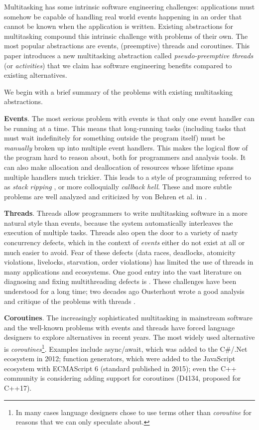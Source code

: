 \documentclass[10pt,preprint]{sigplanconf}
\begin{document}
Multitasking has some intrinsic software engineering challenges: applications must somehow be capable of handling real world events happening in an order that cannot be known when the application is written.
Existing abstractions for multitasking compound this intrinsic challenge with problems of their own.
The most popular abstractions are events, (preemptive) threads and coroutines.
This paper introduces a new multitasking abstraction called \emph{pseudo-preemptive threads} (or \emph{activities}) that we claim has software engineering benefits compared to existing alternatives.

We begin with a brief summary of the problems with existing multitasking abstractions.

\textbf{Events}.
The most serious problem with events is that only one event handler can be running at a time.
This means that long-running tasks (including tasks that must wait indefinitely for something outside the program itself) must be \emph{manually} broken up into multiple event handlers.
This makes the logical flow of the program hard to reason about, both for programmers and analysis tools.
It can also make allocation and deallocation of resources whose lifetime spans multiple handlers much trickier.
This leads to a style of programming referred to as \emph{stack ripping} \cite{Adya2002}, or more colloquially \emph{callback hell}.
These and more subtle problems are well analyzed and criticized by von Behren et al. in \cite{Behren2003a}.

\textbf{Threads}.
Threads allow programmers to write multitasking software in a more natural style than events, because the system automatically interleaves the execution of multiple tasks.
Threads also open the door to a variety of nasty concurrency defects, which in the context of \emph{events} either do not exist at all or much easier to avoid.
Fear of these defects (data races, deadlocks, atomicity violations, livelocks, starvation, order violations) has limited the use of threads in many applications and ecosystems.
One good entry into the vast literature on diagnosing and fixing multithreading defects is \cite{Lu2008}.
These challenges have been understood for a long time; two decades ago Ousterhout wrote a good analysis and critique of the problems with threads \cite{Ousterhout1996}.

\textbf{Coroutines}.
The increasingly sophisticated multitasking in mainstream software and the well-known problems with events and threads have forced language designers to explore alternatives in recent years.
The most widely used alternative is \emph{coroutines}\footnote{In many cases language designers chose to use terms other than \emph{coroutine} for reasons that we can only speculate about.}.
Examples include async/await, which was added to the C\#/.Net ecosystem in 2012; function generators, which were added to the JavaScript ecosystem with ECMAScript 6 (standard published in 2015); even the C++ community is considering adding support for coroutines (D4134, proposed for C++17).
\end{document}

